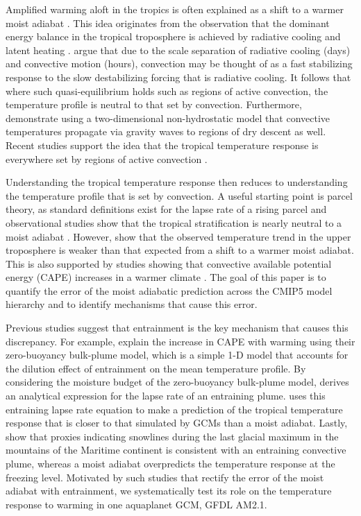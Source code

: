 \documentclass{ametsocV5}
\begin{document}
Amplified warming aloft in the tropics is often explained as a shift to a warmer moist adiabat \citep{po-chedley-fu-2012}. This idea originates from the observation that the dominant energy balance in the tropical troposphere is achieved by radiative cooling and latent heating \citep{riehl-malkus-1958}. \citet{arakawa-schubert-1974} argue that due to the scale separation of radiative cooling (days) and convective motion (hours), convection may be thought of as a fast stabilizing response to the slow destabilizing forcing that is radiative cooling. It follows that where such quasi-equilibrium holds such as regions of active convection, the temperature profile is neutral to that set by convection. Furthermore, \citep{bretherton-smolarkiewicz-1989} demonstrate using a two-dimensional non-hydrostatic model that convective temperatures propagate via gravity waves to regions of dry descent as well. Recent studies support the idea that the tropical temperature response is everywhere set by regions of active convection \citep{fueglistaler-et-al-2015, andrews-webb-2018, zhang-fueglistaler-2020}.

Understanding the tropical temperature response then reduces to understanding the temperature profile that is set by convection. A useful starting point is parcel theory, as standard definitions exist for the lapse rate of a rising parcel and observational studies show that the tropical stratification is nearly neutral to a moist adiabat \citep{betts-1982, xu-emanuel-1989}. However, \citep{flannaghan-et-al-2014} show that the observed temperature trend in the upper troposphere is weaker than that expected from a shift to a warmer moist adiabat. This is also supported by studies showing that convective available potential energy (CAPE) increases in a warmer climate \citep{singh-ogorman-2013, seeley-romps-2015}. The goal of this paper is to quantify the error of the moist adiabatic prediction across the CMIP5 model hierarchy and to identify mechanisms that cause this error.

Previous studies suggest that entrainment is the key mechanism that causes this discrepancy. For example, \citet{singh-ogorman-2013} explain the increase in CAPE with warming using their zero-buoyancy bulk-plume model, which is a simple 1-D model that accounts for the dilution effect of entrainment on the mean temperature profile. By considering the moisture budget of the zero-buoyancy bulk-plume model, \citet{romps-2014} derives an analytical expression for the lapse rate of an entraining plume. \citet{po-chedley-et-al-2019} uses this entraining lapse rate equation to make a prediction of the tropical temperature response that is closer to that simulated by GCMs than a moist adiabat. Lastly, \citet{tripati-et-al-2014} show that proxies indicating snowlines during the last glacial maximum in the mountains of the Maritime continent is consistent with an entraining convective plume, whereas a moist adiabat overpredicts the temperature response at the freezing level. Motivated by such studies that rectify the error of the moist adiabat with entrainment, we systematically test its role on the temperature response to warming in one aquaplanet GCM, GFDL AM2.1.
\end{document}
